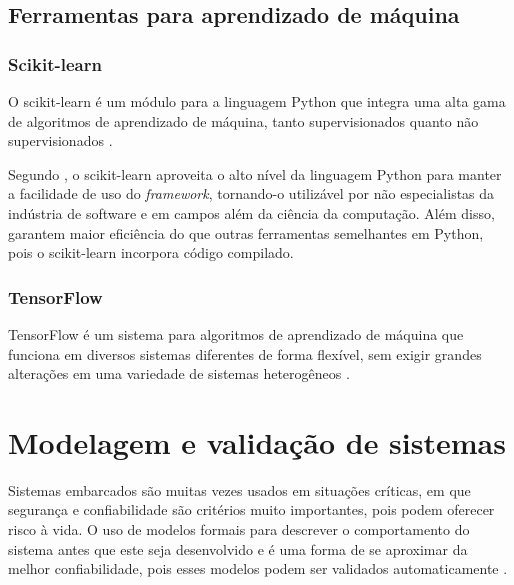 \subsection{Ferramentas para aprendizado de máquina}
\label{sec:ml_frameworks}

\subsubsection{Scikit-learn}
\label{sec:ml_sklearn}

O scikit-learn é um módulo para a linguagem Python que integra uma alta gama de algoritmos de aprendizado de máquina, tanto supervisionados quanto não supervisionados \cite{pedregosa:2011}.

Segundo , o scikit-learn aproveita o alto nível da linguagem Python para manter a facilidade de uso do \textit{framework}, tornando-o utilizável por não especialistas da indústria de software e em campos além da ciência da computação. Além disso,  garantem maior eficiência do que outras ferramentas semelhantes em Python, pois o scikit-learn incorpora código compilado.

\subsubsection{TensorFlow}
\label{sec:ml_tf}
TensorFlow é um sistema para algoritmos de aprendizado de máquina que funciona em diversos sistemas diferentes de forma flexível, sem exigir grandes alterações em uma variedade de sistemas heterogêneos \cite{abadi:2016}.

\section{Modelagem e validação de sistemas}
\label{sec:modelosformais}
Sistemas embarcados são muitas vezes usados em situações críticas, em que segurança e confiabilidade são critérios muito importantes, pois podem oferecer risco à vida. O uso de modelos formais para descrever o comportamento do sistema antes que este seja desenvolvido e é uma forma de se aproximar da melhor confiabilidade, pois esses modelos podem ser validados automaticamente \cite{edwards:1997}.

